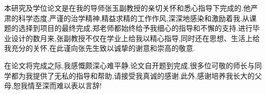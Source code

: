 
\begin{zhixie}
本研究及学位论文是在我的导师张玉副教授的亲切关怀和悉心指导下完成的.他严肃的科学态度,严谨的治学精神,精益求精的工作作风,深深地感染和激励着我.从课题的选择到项目的最终完成,郑老师都始终给予我细心的指导和不懈的支持.进行毕业设计的数月来,张副教授不仅在学业上给我以精心指导,同时还在思想、生活上给我充分的关怀,在此谨向张先生致以诚挚的谢意和崇高的敬意.

在论文将完成之际,我感慨颇深心难平静.论文自开题到完成,很多位可敬的师长与同学都为我提供了无私的指导和帮助,请接受我真诚的感谢.此外,感谢培养我长大的父母,恕我情至深而难以表以言辞!

\end{zhixie}